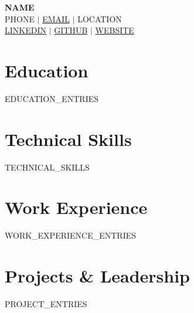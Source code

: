 \documentclass[letterpaper,11pt]{article}
\newcommand{\resumeSubHeadingListStart}{\begin{itemize}[leftmargin=0.15in, label={}]}
\newcommand{\resumeSubHeadingListEnd}{\end{itemize}}
\begin{document}
\begin{center}
    \textbf{\Huge \scshape {{NAME}}} \\ \vspace{1pt}
    \small {{PHONE}} $|$ 
    \href{mailto:{{EMAIL}}}{{{EMAIL}}} $|$ 
    {{LOCATION}} \\
    \href{{{LINKEDIN}}}{{LINKEDIN}} $|$
    \href{{{GITHUB}}}{{GITHUB}} $|$
    \href{{{WEBSITE}}}{{WEBSITE}}
\end{center}

\section{Education}
  \resumeSubHeadingListStart
    {{EDUCATION_ENTRIES}}
  \resumeSubHeadingListEnd

\section{Technical Skills}
 \begin{itemize}[leftmargin=0.15in, label={}]
    \small{\item{
     {{TECHNICAL_SKILLS}}
    }}
 \end{itemize}

\section{Work Experience}
  \resumeSubHeadingListStart
    {{WORK_EXPERIENCE_ENTRIES}}
  \resumeSubHeadingListEnd

\section{Projects \& Leadership}
    \resumeSubHeadingListStart
      {{PROJECT_ENTRIES}}
    \resumeSubHeadingListEnd
\end{document}
